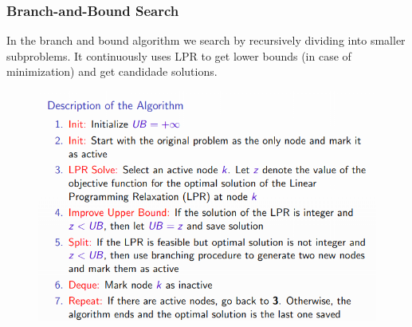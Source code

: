 \documentclass[10pt,a4paper]{report}
\begin{document}
\subsubsection{Branch-and-Bound Search}
In the branch and bound algorithm we search by recursively dividing into smaller subproblems. It continuously uses LPR to get lower bounds (in case of minimization) and get candidade solutions.
\begin{figure}[H]
    \centering
    \includegraphics[scale=0.5]{22.png}
\end{figure}
\end{document}
